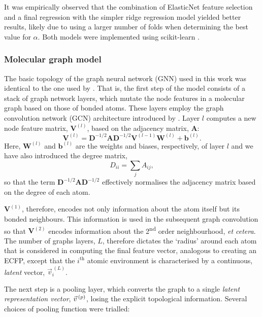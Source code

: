 It was empirically observed that the combination of ElasticNet feature selection and a final regression with the simpler ridge regression model yielded better results, likely due to using a larger number of folds when determining the best value for $\alpha$. Both models were implemented using scikit-learn \cite{pedregosaScikitlearnMachineLearning2011}.

\subsubsection{Molecular graph model}

The basic topology of the graph neural network (GNN) used in this work was identical to the one used by \citet{qinPredictingCriticalMicelle2021}. That is, the first step of the model consists of a stack of graph network layers, which mutate the node features in a molecular graph based on those of bonded atoms.
These layers employ the graph convolution network (GCN) architecture introduced by \cite{kipfSemiSupervisedClassificationGraph2017a}. Layer $l$ computes a new node feature matrix, $\mathbf{V}^{(l)}$, based on the adjacency matrix, $\mathbf{A}$:
\begin{equation}
    \mathbf{V}^{(l)} = \mathbf{D}^{-1/2} \mathbf{A} \mathbf{D}^{-1/2} \mathbf{V}^{(l-1)} \mathbf{W}^{(l)} + \mathbf{b}^{(l)}.
\end{equation}
Here, $\mathbf{W}^{(l)}$ and $\mathbf{b}^{(l)}$ are the weights and biases,
respectively, of layer $l$ and we have also introduced the degree matrix,
\begin{equation}
    D_{ii} = \sum_j A_{ij},
\end{equation}
so that the term $\mathbf{D}^{-1/2} \mathbf{A}
    \mathbf{D}^{-1/2}$ effectively normalises the adjacency matrix based on
the degree of each atom.

$\mathbf{V}^{(1)}$, therefore, encodes not only information about the atom itself but its bonded neighbours. This information is used in the subsequent graph convolution so that $\mathbf{V}^{(2)}$ encodes information about the
2\textsuperscript{nd} order neighbourhood, \emph{et cetera}. The number of graphs layers, $L$, therefore dictates the `radius' around each atom that is considered in computing the final feature vector, analogous to creating an ECFP, except that the $i^\text{th}$ atomic environment is characterised by a continuous, \emph{latent} vector, $\vec{v}^{\,(L)}_i$.

The next step is a pooling layer, which converts the graph to a single \emph{latent representation vector}, $\vec{v}^{\,(p)}{}$, losing the explicit topological information. Several choices of pooling function were trialled:

